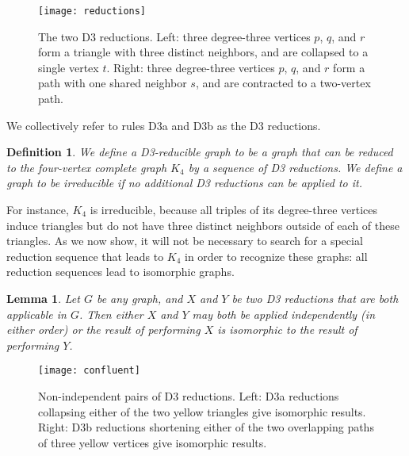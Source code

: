 \documentclass{article}
\newtheorem{lemma}{Lemma}
\newtheorem{definition}{Definition}
\begin{document}
\begin{figure}[t]
\centering
\texttt{[image: reductions]}
\caption{The two D3 reductions. Left: three degree-three vertices $p$, $q$, and $r$ form a triangle with three distinct neighbors, and are collapsed to a single vertex $t$. Right: three degree-three vertices $p$, $q$, and $r$ form a path with one shared neighbor $s$, and are contracted to a two-vertex path.}
\label{fig:reductions}
\end{figure}

We collectively refer to rules D3a and D3b as the D3 reductions.

\begin{definition}
We define a \emph{D3-reducible graph} to be a graph that can be reduced to the four-vertex complete graph $K_4$ by a sequence of D3 reductions. We define a graph to be \emph{irreducible} if no additional D3 reductions can be applied to it.
\end{definition}

For instance, $K_4$ is irreducible, because all triples of its degree-three vertices induce triangles but do not have three distinct neighbors outside of each of these triangles.
As we now show, it will not be necessary to search for a special reduction sequence that leads to $K_4$ in order to recognize these graphs: all reduction sequences lead to isomorphic graphs.

\begin{lemma}
\label{lem:interchangeable}
Let $G$ be any graph, and $X$ and $Y$ be two D3 reductions that are both applicable in $G$.
Then either $X$ and $Y$ may both be applied independently (in either order) or the result of performing $X$ is isomorphic to the result of performing $Y$.
\end{lemma}

\begin{figure}[b]
\centering
\texttt{[image: confluent]}
\caption{Non-independent pairs of D3 reductions. Left: D3a reductions collapsing either of the two yellow triangles give isomorphic results. Right: D3b reductions shortening either of the two overlapping paths of three yellow vertices give isomorphic results.}
\label{fig:confluent}
\end{figure}
\end{document}
